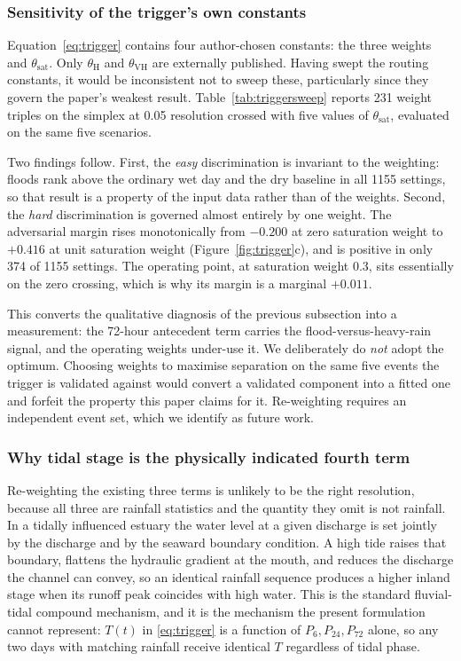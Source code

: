 \documentclass[journal]{IEEEtran}
\newcommand{\Tt}{T(t)}
\begin{document}
\subsubsection*{Sensitivity of the trigger's own constants}
\label{sec:res-trigger-sweep}
Equation~\eqref{eq:trigger} contains four author-chosen constants: the three
weights and $\theta_{\mathrm{sat}}$. Only $\theta_{\mathrm{H}}$ and
$\theta_{\mathrm{VH}}$ are externally published. Having swept the routing
constants, it would be inconsistent not to sweep these, particularly since they
govern the paper's weakest result. Table~\ref{tab:triggersweep} reports 231
weight triples on the simplex at 0.05 resolution crossed with five values of
$\theta_{\mathrm{sat}}$, evaluated on the same five scenarios.

Two findings follow. First, the \emph{easy} discrimination is invariant to the
weighting: floods rank above the ordinary wet day and the dry baseline in all
\num{1155} settings, so that result is a property of the input data rather than
of the weights.
Second, the \emph{hard} discrimination is governed almost entirely by one weight.
The adversarial margin rises monotonically from $-0.200$ at zero saturation
weight to $+0.416$ at unit saturation weight
(Figure~\ref{fig:trigger}c), and is positive in only 374 of \num{1155} settings.
The operating point, at saturation weight 0.3, sits essentially on the zero
crossing, which is why its margin is a marginal $+0.011$.

This converts the qualitative diagnosis of the previous subsection into a
measurement: the 72-hour antecedent term carries the flood-versus-heavy-rain
signal, and the operating weights under-use it. We deliberately do \emph{not}
adopt the optimum. Choosing weights to maximise separation on the same five
events the trigger is validated against would convert a validated component into
a fitted one and forfeit the property this paper claims for it. Re-weighting
requires an independent event set, which we identify as future work.

\subsubsection*{Why tidal stage is the physically indicated fourth term}
Re-weighting the existing three terms is unlikely to be the right resolution,
because all three are rainfall statistics and the quantity they omit is not
rainfall. In a tidally influenced estuary the water level at a given discharge is
set jointly by the discharge and by the seaward boundary condition. A high tide
raises that boundary, flattens the hydraulic gradient at the mouth, and reduces
the discharge the channel can convey, so an identical rainfall sequence produces a
higher inland stage when its runoff peak coincides with high water. This is the
standard fluvial-tidal compound mechanism, and it is the mechanism the present
formulation cannot represent: $\Tt$ in \eqref{eq:trigger} is a function of
$P_6, P_{24}, P_{72}$ alone, so any two days with matching rainfall receive
identical $T$ regardless of tidal phase.
\end{document}
